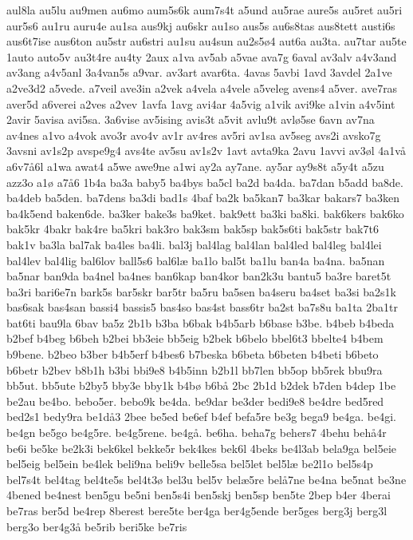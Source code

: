 aul8la
au5lu
au9men
au6mo
aum5s6k
aum7s4t
a5und
au5rae
aure5s
au5ret
au5ri
aur5s6
au1ru
auru4e
au1sa
aus9kj
au6skr
au1so
aus5s
au6s8tas
aus8tett
austi6s
aus6t7ise
aus6ton
au5str
au6stri
au1su
au4sun
au2s5^^f84
aut6a
au3ta.
au7tar
au5te
1auto
auto5v
au3t4re
au4ty
2aux
a1va
av5ab
a5vae
ava7g
6aval
av3alv
a4v3and
av3ang
a4v5anl
3a4van5s
a9var.
av3art
avar6ta.
4avas
5avbi
1avd
3avdel
2a1ve
a2ve3d2
a5vede.
a7veil
ave3in
a2vek
a4vela
a4vele
a5veleg
avens4
a5ver.
ave7ras
aver5d
a6verei
a2ves
a2vev
1avfa
1avg
avi4ar
4a5vig
a1vik
avi9ke
a1vin
a4v5int
2avir
5avisa
avi5sa.
3a6vise
av5ising
avis3t
a5vit
avlu9t
avl^^f85se
6avn
av7na
av4nes
a1vo
a4vok
avo3r
avo4v
av1r
av4res
av5ri
av1sa
av5seg
avs2i
avsko7g
3avsni
av1s2p
avspe9g4
avs4te
av5su
av1s2v
1avt
avta9ka
2avu
1avvi
av3^^f8l
4a1v^^e5
a6v7^^e56l
a1wa
awat4
a5we
awe9ne
a1wi
ay2a
ay7ane.
ay5ar
ay9s8t
a5y4t
a5zu
azz3o
a1^^f8
a7^^e56
1b4a
ba3a
baby5
ba4bys
ba5cl
ba2d
ba4da.
ba7dan
b5add
ba8de.
ba4deb
ba5den.
ba7dens
ba3di
bad1s
4baf
ba2k
ba5kan7
ba3kar
bakars7
ba3ken
ba4k5end
baken6de.
ba3ker
bake3s
ba9ket.
bak9ett
ba3ki
ba8ki.
bak6kers
bak6ko
bak5kr
4bakr
bak4re
ba5kri
bak3ro
bak3sm
bak5sp
bak5s6ti
bak5str
bak7t6
bak1v
ba3la
bal7ak
ba4les
ba4li.
bal3j
bal4lag
bal4lan
bal4led
bal4leg
bal4lei
bal4lev
bal4lig
bal6lov
ball5s6
bal6l^^e6
ba1lo
bal5t
ba1lu
ban4a
ba4na.
ba5nan
ba5nar
ban9da
ba4nel
ba4nes
ban6kap
ban4kor
ban2k3u
bantu5
ba3re
baret5t
ba3ri
bari6e7n
bark5s
bar5skr
bar5tr
ba5ru
ba5sen
ba4seru
ba4set
ba3si
ba2s1k
bas6sak
bas4san
bassi4
bassis5
bas4so
bas4st
bass6tr
ba2st
ba7s8u
ba1ta
2ba1tr
bat6ti
bau9la
6bav
ba5z
2b1b
b3ba
b6bak
b4b5arb
b6base
b3be.
b4beb
b4beda
b2bef
b4beg
b6beh
b2bei
bb3eie
bb5eig
b2bek
b6belo
bbel6t3
bbelte4
b4bem
b9bene.
b2beo
b3ber
b4b5erf
b4bes6
b7beska
b6beta
b6beten
b4beti
b6beto
b6betr
b2bev
b8b1h
b3bi
bbi9e8
b4b5inn
b2b1l
bb7len
bb5op
bb5rek
bbu9ra
bb5ut.
bb5ute
b2by5
bby3e
bby1k
b4b^^f8
b6b^^e5
2bc
2b1d
b2dek
b7den
b4dep
1be
be2au
be4bo.
bebo5er.
bebo9k
be4da.
be9dar
be3der
bedi9e8
be4dre
bed5red
bed2s1
bedy9ra
be1d^^e53
2bee
be5ed
be6ef
b4ef
befa5re
be3g
bega9
be4ga.
be4gi.
be4gn
be5go
be4g5re.
be4g5rene.
be4g^^e5.
be6ha.
beha7g
behers7
4behu
beh^^e54r
be6i
be5ke
be2k3i
bek6kel
bekke5r
bek4kes
bek6l
4beks
be4l3ab
bela9ga
bel5eie
bel5eig
bel5ein
be4lek
beli9na
beli9v
belle5sa
bel5let
bel5l^^e6
be2l1o
bel5s4p
bel7s4t
bel4tag
bel4te5s
bel4t3^^f8
bel3u
bel5v
bel^^e65re
bel^^e57ne
be4na
be5nat
be3ne
4bened
be4nest
ben5gu
be5ni
ben5s4i
ben5skj
ben5sp
ben5te
2bep
b4er
4berai
be7ras
ber5d
be4rep
8berest
bere5te
ber4ga
ber4g5ende
ber5ges
berg3j
berg3l
berg3o
ber4g3^^e5
be5rib
beri5ke
be7ris
